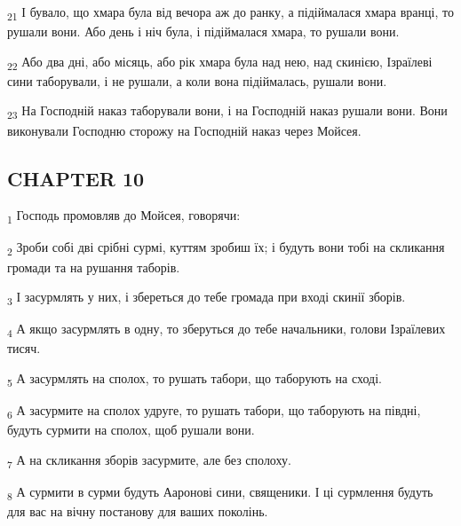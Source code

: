 \begin{tcolorbox}
\textsubscript{21} І бувало, що хмара була від вечора аж до ранку, а підіймалася хмара вранці, то рушали вони. Або день і ніч була, і підіймалася хмара, то рушали вони.
\end{tcolorbox}
\begin{tcolorbox}
\textsubscript{22} Або два дні, або місяць, або рік хмара була над нею, над скинією, Ізраїлеві сини таборували, і не рушали, а коли вона підіймалась, рушали вони.
\end{tcolorbox}
\begin{tcolorbox}
\textsubscript{23} На Господній наказ таборували вони, і на Господній наказ рушали вони. Вони виконували Господню сторожу на Господній наказ через Мойсея.
\end{tcolorbox}
\subsection{CHAPTER 10}
\begin{tcolorbox}
\textsubscript{1} Господь промовляв до Мойсея, говорячи:
\end{tcolorbox}
\begin{tcolorbox}
\textsubscript{2} Зроби собі дві срібні сурмі, куттям зробиш їх; і будуть вони тобі на скликання громади та на рушання таборів.
\end{tcolorbox}
\begin{tcolorbox}
\textsubscript{3} І засурмлять у них, і збереться до тебе громада при вході скинії зборів.
\end{tcolorbox}
\begin{tcolorbox}
\textsubscript{4} А якщо засурмлять в одну, то зберуться до тебе начальники, голови Ізраїлевих тисяч.
\end{tcolorbox}
\begin{tcolorbox}
\textsubscript{5} А засурмлять на сполох, то рушать табори, що таборують на сході.
\end{tcolorbox}
\begin{tcolorbox}
\textsubscript{6} А засурмите на сполох удруге, то рушать табори, що таборують на півдні, будуть сурмити на сполох, щоб рушали вони.
\end{tcolorbox}
\begin{tcolorbox}
\textsubscript{7} А на скликання зборів засурмите, але без сполоху.
\end{tcolorbox}
\begin{tcolorbox}
\textsubscript{8} А сурмити в сурми будуть Ааронові сини, священики. І ці сурмлення будуть для вас на вічну постанову для ваших поколінь.
\end{tcolorbox}
